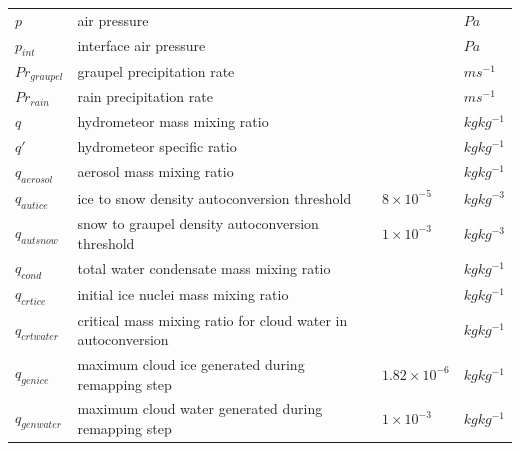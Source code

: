 \documentclass[letterpaper,titlepage,10pt]{article}
\numberwithin{equation}{section}
\begin{document}
\begin{appendices}
\begin{longtable}{p{}p{}p{}p{}}
	$p$                & air pressure                                                                         &                            & $Pa$ \\
	$p_{int}$          & interface air pressure                                                               &                            & $Pa$ \\
	$Pr_{graupel}$     & graupel precipitation rate                                                           &                            & $m s^{-1}$ \\
	$Pr_{rain}$        & rain precipitation rate                                                              &                            & $m s^{-1}$ \\
	$q$                & hydrometeor mass mixing ratio                                                        &                            & $kg kg^{-1}$ \\
	$q'$               & hydrometeor specific ratio                                                           &                            & $kg kg^{-1}$ \\
	$q_{aerosol}$      & aerosol mass mixing ratio                                                            &                            & $kg kg^{-1}$ \\
	$q_{autice}$       & ice to snow density autoconversion threshold                                         & $8 \times 10^{-5}$         & $kg kg^{-3}$ \\
	$q_{autsnow}$      & snow to graupel density autoconversion threshold                                     & $1 \times 10^{-3}$         & $kg kg^{-3}$ \\
	$q_{cond}$         & total water condensate mass mixing ratio                                             &                            & $kg kg^{-1}$ \\
	$q_{crtice}$       & initial ice nuclei mass mixing ratio                                                 &                            & $kg kg^{-1}$ \\
	$q_{crtwater}$     & critical mass mixing ratio for cloud water in autoconversion                         &                            & $kg kg^{-1}$ \\
	$q_{genice}$       & maximum cloud ice generated during remapping step                                    & $1.82 \times 10^{-6}$      & $kg kg^{-1}$ \\
	$q_{genwater}$     & maximum cloud water generated during remapping step                                  & $1 \times 10^{-3}$         & $kg kg^{-1}$ \\

\end{longtable}
\end{appendices}
\end{document}
